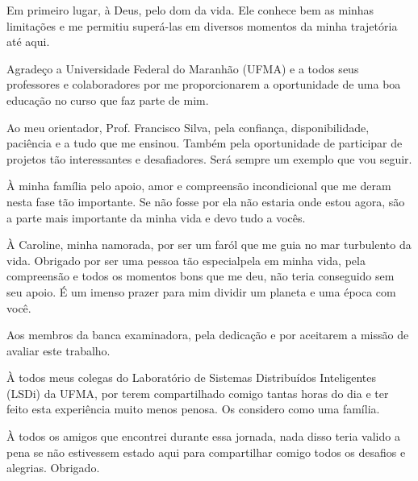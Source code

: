 \begin{agradecimentos}
Em primeiro lugar, à Deus, pelo dom da vida.
Ele conhece bem as minhas limitações e me permitiu superá-las em diversos momentos da minha trajetória até aqui.

Agradeço a Universidade Federal do Maranhão (UFMA) e a todos seus professores e colaboradores por me proporcionarem a oportunidade de uma boa educação no curso que faz parte de mim.

Ao meu orientador, Prof. Francisco Silva, pela confiança, disponibilidade, paciência e a tudo que me ensinou.
Também pela oportunidade de participar de projetos tão interessantes e desafiadores.
Será sempre um exemplo que vou seguir.


À minha família pelo apoio, amor e compreensão incondicional que me deram nesta fase tão importante.
Se não fosse por ela não estaria onde estou agora, são a parte mais importante da minha vida e devo tudo a vocês.

À Caroline, minha namorada, por ser um faról que me guia no mar turbulento da vida.
Obrigado por ser uma pessoa tão especialpela em minha vida, pela compreensão e todos os momentos bons que me deu, não teria conseguido sem seu apoio.
É um imenso prazer para mim dividir um planeta e uma época com você.

Aos membros da banca examinadora, pela dedicação e por aceitarem a missão de avaliar este trabalho.

À todos meus colegas do Laboratório de Sistemas Distribuídos Inteligentes (LSDi) da UFMA, por terem compartilhado comigo tantas horas do dia e ter feito esta experiência muito menos penosa.
Os considero como uma família.

À todos os amigos que encontrei durante essa jornada, nada disso teria valido a pena se não estivessem estado aqui para compartilhar comigo todos os desafios e alegrias.
Obrigado.


\end{agradecimentos}
